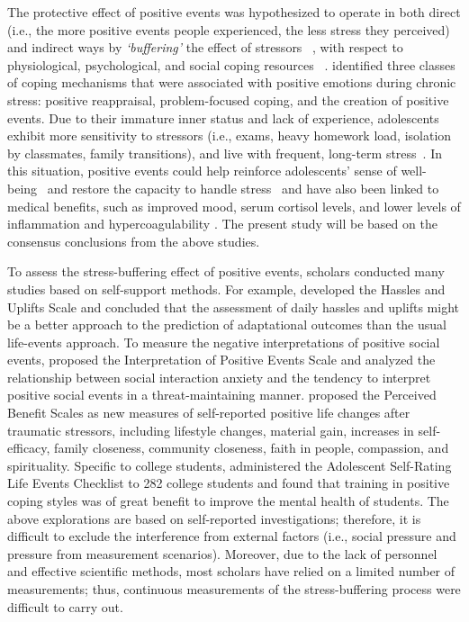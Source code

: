 \documentclass[5p,times,numbers,authoryear]{elsarticle}
\begin{document}
The protective effect of positive events was hypothesized to operate in both direct (i.e., the more positive events people experienced, the less stress they perceived)
and indirect ways by \emph{`buffering'} the effect of stressors ~\citep{Cohen2010Positive,Shahar2002Positive},
with respect to physiological, psychological, and social coping resources ~\citep{Cohen1984Positive, Needles1990Positive}.
\citep{Folkman2010Stress} identified three classes of coping mechanisms that were associated with positive emotions during chronic stress: positive reappraisal, problem-focused coping, and the creation of positive events.
Due to their immature inner status and lack of experience,
adolescents exhibit more sensitivity to stressors
(i.e., exams, heavy homework load, isolation by classmates, family transitions),
and live with frequent, long-term stress~\citep{older}.
In this situation, positive events could help reinforce adolescents' sense of well-being~\citep{Coolidge2009A} and
restore the capacity to handle stress~\citep{Doyle2003Positive}
and have also been linked to medical benefits, such as improved mood, serum cortisol levels, and lower levels of inflammation and hypercoagulability \citep{Jain2010Effects,Caputo1998Influence}.
The present study will be based on the consensus conclusions from the above studies.

To assess the stress-buffering effect of positive events,
scholars conducted many studies based on self-support methods.
For example,
\citep{Kanner1981Comparison} developed the Hassles and Uplifts Scale
and concluded that the assessment of daily hassles and uplifts might be a better approach to the prediction of adaptational outcomes than the usual life-events approach.
To measure the negative interpretations of positive social events,
\citep{Alden2008Social} proposed the Interpretation of Positive Events Scale and analyzed
{the relationship between social interaction anxiety and the tendency to interpret positive social events in a threat-maintaining manner.}
\citep{Mcmillen1998The} proposed the Perceived Benefit Scales as new measures of self-reported positive life changes after traumatic stressors, including lifestyle changes, material gain, increases in self-efficacy, family closeness, community closeness, faith in people, compassion, and spirituality.
Specific to college students,
\citep{Jun2008Influence} administered the Adolescent Self-Rating Life Events Checklist  to 282 college students  and found that training in positive coping styles was of great benefit to improve the mental health of students.
The above explorations are based on self-reported investigations; therefore, it is difficult to exclude the interference from external factors (i.e., social pressure and pressure from measurement scenarios).
Moreover, due to the lack of personnel and effective scientific methods,
most scholars have relied on a limited number of measurements;
thus, continuous measurements of the stress-buffering process were difficult to carry out.
\end{document}
